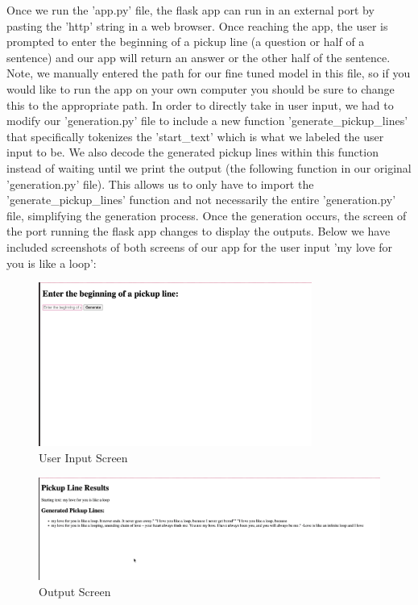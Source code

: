 \documentclass[12pt,reqno]{amsart}
\theoremstyle{plain}
\theoremstyle{definition}
\theoremstyle{remark}
\begin{document}
Once we run the 'app.py' file, the flask app can run in an external port by pasting the 'http' string in a web browser. Once reaching the app, the user is prompted to enter the beginning of a pickup line (a question or half of a sentence) and our app will return an answer or the other half of the sentence. Note, we manually entered the path for our fine tuned model in this file, so if you would like to run the app on your own computer you should be sure to change this to the appropriate path. In order to directly take in user input, we had to modify our 'generation.py' file to include a new function 'generate\_pickup\_lines' that specifically tokenizes the 'start\_text' which is what we labeled the user input to be. We also decode the generated pickup lines within this function instead of waiting until we print the output (the following function in our original 'generation.py' file). This allows us to only have to import the 'generate\_pickup\_lines' function and not necessarily the entire 'generation.py' file, simplifying the generation process. Once the generation occurs, the screen of the port running the flask app changes to display the outputs. Below we have included screenshots of both screens of our app for the user input 'my love for you is like a loop':

\begin{figure}[H]
\centering
\includegraphics[width=0.8\textwidth]{pictures/flask pg1.png}
\caption{User Input Screen}
\end{figure}



\begin{figure}[H]
\centering
\includegraphics[width=1\textwidth]{pictures/flask pg2.png}
\caption{Output Screen}
\end{figure}
\end{document}
